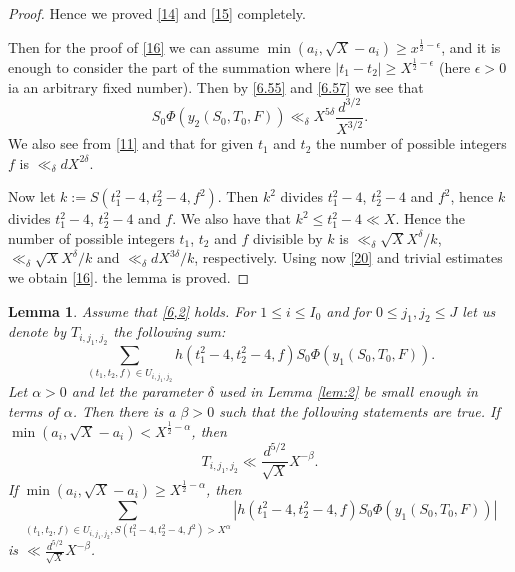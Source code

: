 \documentclass[12pt]{amsart}
\newtheorem{lemma}[theorem]{Lemma}
\theoremstyle{definition}
\numberwithin{equation}{section}
\begin{document}
\begin{proof}
Hence we proved \eqref{14} and \eqref{15} completely.


Then for the proof of \eqref{16} we can assume
$\min\left(a_i,\sqrt {X}-a_i\right)\ge x^{\frac 12-\epsilon}$, and it is enough to consider the
part of the summation where $\left|t_1-t_2\right|\ge X^{\frac 12-
\epsilon}$ (here $\epsilon >0$
ia an arbitrary fixed number). Then by \eqref{6.55} and
\eqref{6.57} we see that
\begin{equation}S_0\Phi\left(y_2\left(S_0,T_0,F\right)\right)\ll_{
\delta}X^{5\delta}\frac {d^{3/2}}{X^{3/2}}.\label{20}\end{equation}
We also see from \eqref{11} and \cite[(6.29)]{Biro} that for given $
t_1$ and $t_2$ the
number of possible integers $f$ is $\ll_{\delta}dX^{2\delta}$.

Now let $k:=S\left(t_1^2-4,t_2^2-4,f^2\right)$. Then $k^2$ divides $
t_1^2-4$,
$t_2^2-4$ and $f^2$, hence $k$ divides $t_1^2-4$,
$t_2^2-4$ and $f$. We also have that $k^2\le t_1^2-4\ll X$. Hence the
number of possible integers $t_1$, $t_2$ and $f$ divisible by $k$ is
$\ll_{\delta}\sqrt XX^{\delta}/k$, $\ll_{\delta}\sqrt XX^{\delta}
/k$ and $\ll_{\delta}dX^{3\delta}/k$, respectively. Using
now \eqref{20} and trivial estimates we obtain
\eqref{16}. the lemma is proved.


\end{proof}



\begin{lemma}\label{lem:4}Assume that \eqref{6,2} holds. For $1\le
i\le I_0$ and for
$0\le j_1,j_2\le J$ let us denote by $T_{i,j_1,j_2}$ the following sum:
\[\sum_{\left(t_1,t_2,f\right)\in U_{i,j_1,j_2}}h\left(t_1^2-4,t_
2^2-4,f\right)S_0\Phi\left(y_1\left(S_0,T_0,F\right)\right).\]
Let $\alpha >0$ and let the parameter $\delta$ used in Lemma \ref{lem:2} be small enough in terms of $\alpha$. Then there is a $\beta >0$ such that the following
statements are true.
If $\min\left(a_i,\sqrt {X}-a_i\right)<X^{\frac 12-\alpha}$, then
\begin{equation}T_{i,j_1,j_2}\ll\frac {d^{5/2}}{\sqrt {X}}X^{-\beta}
.\label{34}\end{equation}
If $\min\left(a_i,\sqrt {X}-a_i\right)\ge X^{\frac 12-\alpha}$, then
\begin{equation}\sum_{\left(t_1,t_2,f\right)\in U_{i,j_1,j_2},S\left
(t_1^2-4,t_2^2-4,f^2\right)>X^{\alpha}}\left|h\left(t_1^2-4,t_2^2
-4,f\right)S_0\Phi\left(y_1\left(S_0,T_0,F\right)\right)\right|\label{36}\end{equation}
is $\ll\frac {d^{5/2}}{\sqrt {X}}X^{-\beta}$.
\end{lemma}
\end{document}
